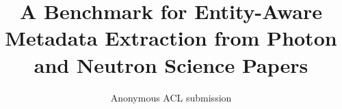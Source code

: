 \documentclass[11pt]{article}
\title{A Benchmark for Entity-Aware Metadata Extraction from Photon and
Neutron Science Papers}
\author{Anonymous ACL submission}
\begin{document}
\maketitle







\FloatBarrier





\appendix

\end{document}
